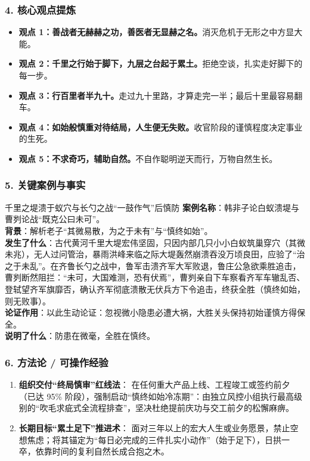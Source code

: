\subsubsection{4. 核心观点提炼}
\begin{itemize}
    \item \textbf{观点 1：善战者无赫赫之功，善医者无显赫之名。}消灭危机于无形之中方显大能。
    \item \textbf{观点 2：千里之行始于脚下，九层之台起于累土。}拒绝空谈，扎实走好脚下的每一步。
    \item \textbf{观点 3：行百里者半九十。}走过九十里路，才算走完一半；最后十里最容易翻车。
    \item \textbf{观点 4：如始般慎重对待结局，人生便无失败。}收官阶段的谨慎程度决定事业的生死。
    \item \textbf{观点 5：不求奇巧，辅助自然。}不自作聪明逆天而行，万物自然生长。
\end{itemize}

\subsubsection{5. 关键案例与事实}
\begin{CaseBox}{千里之堤溃于蚁穴与长勺之战“一鼓作气”后慎防}
\textbf{案例名称}：韩非子论白蚁溃堤与曹刿论战“既克公曰未可”。\\
\textbf{背景}：解析老子“其微易散，为之于未有”与“慎终如始”。\\
\textbf{发生了什么}：古代黄河千里大堤宏伟坚固，只因内部几只小小白蚁筑巢穿穴（其微未兆），无人过问管治，暴雨洪峰来临之际大堤轰然崩溃吞没万顷良田，应验了“治之于未乱”。在齐鲁长勺之战中，鲁军击溃齐军大军败退，鲁庄公急欲乘胜追击，曹刿断然阻拦：“未可，大国难测，恐有伏焉”，曹刿亲自下车察看齐军车辙乱否、登轼望齐军旗靡否，确认齐军彻底溃散无伏兵方下令追击，终获全胜（慎终如始，则无败事）。\\
\textbf{论证作用}：以此生动论证：忽视微小隐患必遭大祸，大胜关头保持初始谨慎方得保全。\\
\textbf{说明了什么}：防患在微毫，全胜在慎终。
\end{CaseBox}

\subsubsection{6. 方法论 / 可操作经验}
\begin{enumerate}
    \item \textbf{组织交付“终局慎审”红线法}：
    在任何重大产品上线、工程竣工或签约前夕（已达 95\% 阶段），强制启动“慎终如始冷冻期”：由独立风控小组执行最高级别的“吹毛求疵式全流程排查”，坚决杜绝提前庆功与交工前夕的松懈麻痹。
    \item \textbf{长期目标“累土足下”推进术}：
    面对三年以上的宏大人生或业务愿景，禁止空想焦虑；将其锚定为“每日必完成的三件扎实小动作”（始于足下），日拱一卒，依靠时间的复利自然长成合抱之木。
\end{enumerate}

